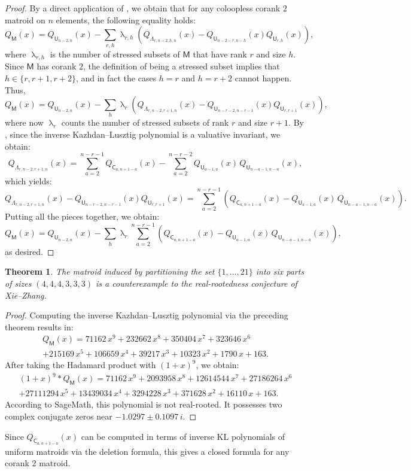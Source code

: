 \documentclass[11pt, a4paper, english]{amsart}
\theoremstyle{teoremas}
\newtheorem{theorem}{Theorem}[section]
\theoremstyle{definition}
\newcommand{\M}{\mathsf{M}}
\newcommand{\U}{\mathsf{U}}
\newcommand{\LL}{\mathsf{\Lambda}}
\newcommand{\C}{\mathsf{C}}
\renewcommand{\lambda}{\uplambda}
\begin{document}
\begin{proof}
    By a direct application of \cite[Theorem~5.3]{ferroni-schroter}, we obtain that for any coloopless corank $2$ matroid on $n$ elements, the following equality holds:
    \[ Q_{\M}(x) = Q_{\U_{n-2,n}}(x) - \sum_{r,h} \lambda_{r,h} \left( Q_{\LL_{r,n-2,h,n}}(x) - Q_{\U_{n-2-r,n-h}}(x) Q_{\U_{r,h}}(x)\right),\]
    where $\lambda_{r,h}$ is the number of stressed subsets of $\M$ that have rank $r$ and size $h$. Since $\M$ has corank $2$, the definition of being a stressed subset implies that $h\in \{r,r+1,r+2\}$, and in fact the cases $h=r$ and $h=r+2$ cannot happen. Thus,
    \[ Q_{\M}(x) = Q_{\U_{n-2,n}}(x) - \sum_{h} \lambda_{r} \left( Q_{\LL_{r,n-2,r+1,n}}(x) - Q_{\U_{n-r-2,n-r-1}}(x) Q_{\U_{r,r+1}}(x)\right),\]
    where now $\lambda_r$ counts the number of stressed subsets of rank $r$ and size $r+1$. By \cite[Corollary~5.7]{ferroni-schroter}, since the inverse Kazhdan--Lusztig polynomial is a valuative invariant, we obtain:
    \[ Q_{\LL_{r,n-2,r+1,n}}(x) = \sum_{a=2}^{n-r-1} Q_{\C_{a,n+1-a}}(x) - \sum_{a=2}^{n-r-2} Q_{\U_{a-1,a}}(x)\, Q_{\U_{n-a-1,n-a}}(x),\]
    which yields:
    \[ Q_{\LL_{r,n-2,r+1,n}}(x)- Q_{\U_{n-r-2,n-r-1}}(x) Q_{\U_{r,r+1}}(x) = \sum_{a=2}^{n-r-1} \left(Q_{\C_{a,n+1-a}}(x) - Q_{\U_{a-1,a}}(x)\, Q_{\U_{n-a-1,n-a}}(x)\right).\]
    Putting all the pieces together, we obtain:
    \[ Q_{\M}(x) = Q_{\U_{n-2,n}}(x) - \sum_{h} \lambda_{r} \sum_{a=2}^{n-r-1} \left(Q_{\C_{a,n+1-a}}(x) - Q_{\U_{a-1,a}}(x)\, Q_{\U_{n-a-1,n-a}}(x)\right),\]
    as desired.
\end{proof}

\begin{theorem}
    The matroid induced by partitioning the set $\{1,\ldots,21\}$ into six parts of sizes $(4,4,4,3,3,3)$ is a counterexample to the real-rootedness conjecture of Xie--Zhang.
\end{theorem}

\begin{proof}
    Computing the inverse Kazhdan--Lusztig polynomial via the preceding theorem results in:
    \begin{multline*} Q_{\M}(x) = 71162 \, x^{9} + 232662 \, x^{8} + 350404 \, x^{7} + 323646 \, x^{6}\\ + 215169 \, x^{5} + 106659 \, x^{4} + 39217 \, x^{3} + 10323 \, x^{2} + 1790 \, x + 163.
    \end{multline*}
    After taking the Hadamard product with $(1+x)^9$, we obtain:
    \begin{multline*}(1+x)^9 * Q_{\M}(x)= 71162 \, x^{9} + 2093958 \, x^{8} + 12614544 \, x^{7} + 27186264 \, x^{6}\\ + 27111294 \, x^{5} + 13439034 \, x^{4} + 3294228 \, x^{3} + 371628 \, x^{2} + 16110 \, x + 163.
    \end{multline*}
    According to SageMath, this polynomial is not real-rooted. It possesses two complex conjugate zeros near $-1.0297\pm 0.1097\,i$.
\end{proof}


Since $Q_{\C_{a,n+1-a}}(x)$ can be computed in terms of inverse KL polynomials of uniform matroids via the deletion formula, this gives a closed formula for any corank $2$ matroid.






\end{document}
